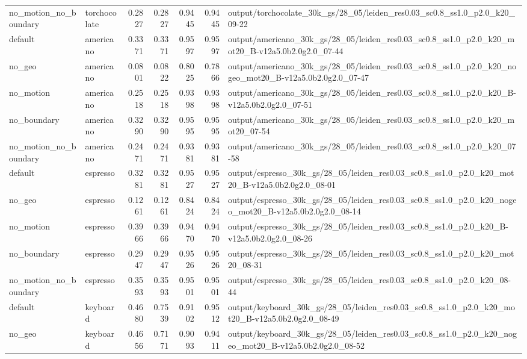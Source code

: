 \documentclass[10pt]{article}
\begin{document}
\begin{longtable}{llrrrrp{9cm}}
no\_motion\_no\_boundary & torchocolate & 0.2827 & 0.2827 & 0.9445 & 0.9445 & output/torchocolate\_30k\_gs/28\_05/leiden\_res0.03\_sc0.8\_ss1.0\_p2.0\_k20\_09-22 \\
default & americano & 0.3371 & 0.3371 & 0.9597 & 0.9597 & output/americano\_30k\_gs/28\_05/leiden\_res0.03\_sc0.8\_ss1.0\_p2.0\_k20\_mot20\_B-v12a5.0b2.0g2.0\_07-44 \\
no\_geo & americano & 0.0801 & 0.0822 & 0.8025 & 0.7866 & output/americano\_30k\_gs/28\_05/leiden\_res0.03\_sc0.8\_ss1.0\_p2.0\_k20\_nogeo\_mot20\_B-v12a5.0b2.0g2.0\_07-47 \\
no\_motion & americano & 0.2518 & 0.2518 & 0.9398 & 0.9398 & output/americano\_30k\_gs/28\_05/leiden\_res0.03\_sc0.8\_ss1.0\_p2.0\_k20\_B-v12a5.0b2.0g2.0\_07-51 \\
no\_boundary & americano & 0.3290 & 0.3290 & 0.9595 & 0.9595 & output/americano\_30k\_gs/28\_05/leiden\_res0.03\_sc0.8\_ss1.0\_p2.0\_k20\_mot20\_07-54 \\
no\_motion\_no\_boundary & americano & 0.2471 & 0.2471 & 0.9381 & 0.9381 & output/americano\_30k\_gs/28\_05/leiden\_res0.03\_sc0.8\_ss1.0\_p2.0\_k20\_07-58 \\
default & espresso & 0.3281 & 0.3281 & 0.9527 & 0.9527 & output/espresso\_30k\_gs/28\_05/leiden\_res0.03\_sc0.8\_ss1.0\_p2.0\_k20\_mot20\_B-v12a5.0b2.0g2.0\_08-01 \\
no\_geo & espresso & 0.1261 & 0.1261 & 0.8424 & 0.8424 & output/espresso\_30k\_gs/28\_05/leiden\_res0.03\_sc0.8\_ss1.0\_p2.0\_k20\_nogeo\_mot20\_B-v12a5.0b2.0g2.0\_08-14 \\
no\_motion & espresso & 0.3966 & 0.3966 & 0.9470 & 0.9470 & output/espresso\_30k\_gs/28\_05/leiden\_res0.03\_sc0.8\_ss1.0\_p2.0\_k20\_B-v12a5.0b2.0g2.0\_08-26 \\
no\_boundary & espresso & 0.2947 & 0.2947 & 0.9526 & 0.9526 & output/espresso\_30k\_gs/28\_05/leiden\_res0.03\_sc0.8\_ss1.0\_p2.0\_k20\_mot20\_08-31 \\
no\_motion\_no\_boundary & espresso & 0.3593 & 0.3593 & 0.9501 & 0.9501 & output/espresso\_30k\_gs/28\_05/leiden\_res0.03\_sc0.8\_ss1.0\_p2.0\_k20\_08-44 \\
default & keyboard & 0.4680 & 0.7539 & 0.9102 & 0.9512 & output/keyboard\_30k\_gs/28\_05/leiden\_res0.03\_sc0.8\_ss1.0\_p2.0\_k20\_mot20\_B-v12a5.0b2.0g2.0\_08-49 \\
no\_geo & keyboard & 0.4656 & 0.7171 & 0.9093 & 0.9411 & output/keyboard\_30k\_gs/28\_05/leiden\_res0.03\_sc0.8\_ss1.0\_p2.0\_k20\_nogeo\_mot20\_B-v12a5.0b2.0g2.0\_08-52 \\

\end{longtable}
\end{document}
